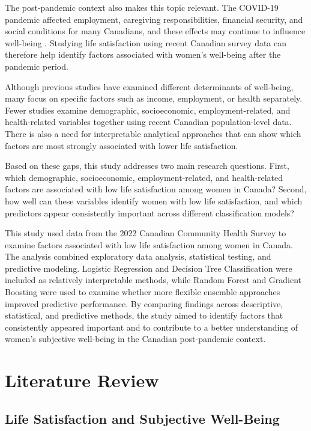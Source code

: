 \documentclass[12pt]{article}
\begin{document}
The post-pandemic context also makes this topic relevant. The COVID-19 pandemic affected employment, caregiving responsibilities, financial security, and social conditions for many Canadians, and these effects may continue to influence well-being \citep{park2024, bilodeau2025}. Studying life satisfaction using recent Canadian survey data can therefore help identify factors associated with women's well-being after the pandemic period.

Although previous studies have examined different determinants of well-being, many focus on specific factors such as income, employment, or health separately. Fewer studies examine demographic, socioeconomic, employment-related, and health-related variables together using recent Canadian population-level data. There is also a need for interpretable analytical approaches that can show which factors are most strongly associated with lower life satisfaction.

Based on these gaps, this study addresses two main research questions. First, which demographic, socioeconomic, employment-related, and health-related factors are associated with low life satisfaction among women in Canada? Second, how well can these variables identify women with low life satisfaction, and which predictors appear consistently important across different classification models?

This study used data from the 2022 Canadian Community Health Survey to examine factors associated with low life satisfaction among women in Canada. The analysis combined exploratory data analysis, statistical testing, and predictive modeling. Logistic Regression and Decision Tree Classification were included as relatively interpretable methods, while Random Forest and Gradient Boosting were used to examine whether more flexible ensemble approaches improved predictive performance. By comparing findings across descriptive, statistical, and predictive methods, the study aimed to identify factors that consistently appeared important and to contribute to a better understanding of women's subjective well-being in the Canadian post-pandemic context.



\section{Literature Review}

\subsection{Life Satisfaction and Subjective Well-Being}
\end{document}
